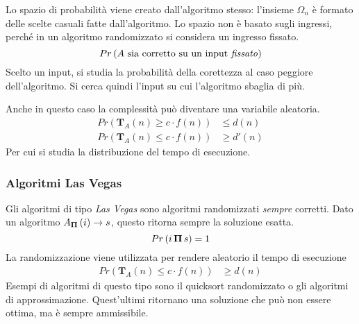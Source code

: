 Lo spazio di probabilità viene creato dall'algoritmo stesso:
l'insieme $
\Omega_n
$ è formato delle scelte casuali fatte dall'algoritmo.
Lo spazio non è basato sugli ingressi, perché in un algoritmo randomizzato si considera un ingresso fissato.
\begin{equation*}
    Pr \left( 
        \text{$A$ sia corretto su un input \emph{fissato}}
    \right)
\end{equation*}
Scelto un input, si studia la probabilità della corettezza al caso peggiore dell'algoritmo.
Si cerca quindi l'input su cui l'algoritmo sbaglia di più.

Anche in questo caso la  complessità può diventare una variabile aleatoria.
\begin{align*}
    Pr \left( 
        \bm{T}_A \left( 
            n
        \right)
        \geq c \cdot f(n)
    \right)
    &
    \leq d(n)
    \\
    Pr \left( 
        \bm{T}_A \left( 
            n
        \right)
        \leq c \cdot f(n)
    \right)
    &
    \geq d'(n)
\end{align*}
Per cui si studia la distribuzione del tempo di esecuzione.

\subsubsection{Algoritmi Las Vegas}
Gli algoritmi di tipo \emph{Las Vegas} sono algoritmi randomizzati \emph{sempre} corretti.
Dato un algoritmo $
A_{\bm{\Pi}{}} \left( i \right) \to s
$, questo ritorna sempre la soluzione esatta.
\begin{equation*}
    Pr \left( 
        i
        \,
        \bm{\Pi}{}
        \,
        s
    \right)
    = 1
\end{equation*}
La randomizzazione viene utilizzata per rendere aleatorio il tempo di esecuzione
\begin{align*}
    Pr \left( 
        \bm{T}_A \left( 
            n
        \right)
        \leq c \cdot f(n)
    \right)
    &
    \geq d(n)
\end{align*}
Esempi di algoritmi di questo tipo sono il quicksort randomizzato o gli algoritmi di approssimazione. Quest'ultimi ritornano una soluzione che può non essere ottima, ma è sempre ammissibile.

